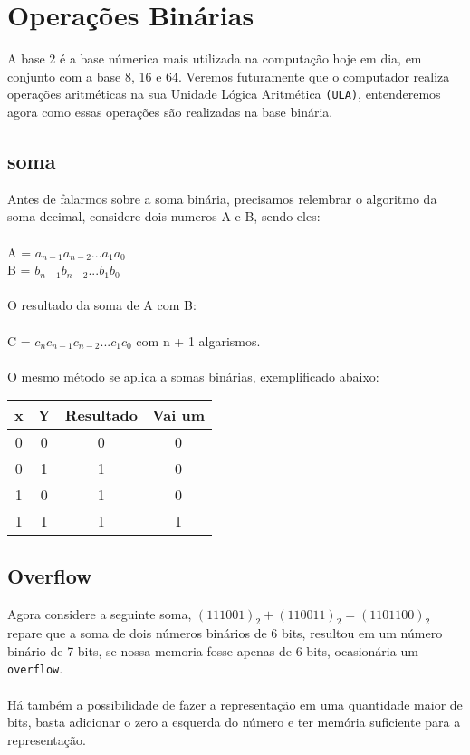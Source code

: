 \documentclass[12pt, onecolumn]{article}
\begin{document}
	\section{Operações Binárias}
	A base 2 é a base númerica mais utilizada na computação hoje em dia, em conjunto
	com a base 8, 16 e 64. Veremos futuramente que o computador realiza operações
	aritméticas na sua Unidade Lógica Aritmética \texttt{(ULA)}, entenderemos
	agora como essas operações são realizadas na base binária.

	\subsection{soma}
	Antes de falarmos sobre a soma binária, precisamos relembrar o algoritmo da
	soma decimal, considere dois numeros A e B, sendo eles:\\
	\\
	A = $a_{n-1} a_{n-2} ... a_1 a_0$\\
	B = $b_{n-1} b_{n-2} ... b_1 b_0$\\
	\\
	O resultado da soma de A com B:\\
	\\
	C = $c_n c_{n-1} c_{n-2} ... c_{1} c_{0}$ com n + 1 algarismos.\\
	\\
	O mesmo método se aplica a somas binárias, exemplificado abaixo:
	\begin{table}[h]
		\begin{tabular}{|c|c|c|c|}
			\hline
			x & Y & Resultado & Vai um \\ \hline
			0 & 0 & 0 & 0 \\ \hline
			0 & 1 & 1 & 0 \\ \hline
			1 & 0 & 1 & 0 \\ \hline
			1 & 1 & 1 & 1 \\ \hline
		\end{tabular}
	\end{table}
	
	\subsection{Overflow}
	Agora considere a seguinte soma, $(111001)_2 + (110011)_2 = (1101100)_2$ 
	repare que a soma de dois números binários de 6 bits, resultou em um número
	binário de 7 bits, se nossa memoria fosse apenas de 6 bits, ocasionária um 
	\texttt{overflow}.\\
	\\
	Há também a possibilidade de fazer a representação em uma quantidade maior de
	bits, basta adicionar o zero a esquerda do número e ter memória suficiente 
	para a representação.
\end{document}
